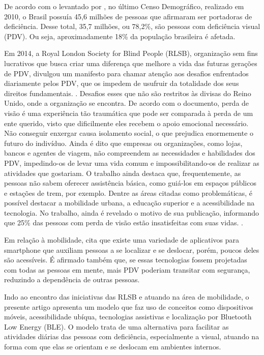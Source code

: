 \documentclass[twoside,english,brazilian]{UNISINOSartigo}
\begin{document}
De acordo com o levantado por , no último Censo Demográfico, realizado em 2010, o Brasil possuía 45,6 milhões de pessoas que afirmaram ser portadoras de deficiência. Desse total, 35,7 milhões, ou 78,2\%, são pessoas com deficiência visual (PDV). Ou seja, aproximadamente 18\% da população brasileira é afetada.

Em 2014, a Royal London Society for Blind People (RLSB), organização sem fins lucrativos que busca criar uma diferença que melhore a vida das futuras gerações de PDV, divulgou um manifesto para chamar atenção aos desafios enfrentados diariamente pelos PDV, que os impedem de usufruir da totalidade dos seus direitos fundamentais. \cite{YouthManifesto}. Desafios esses que não são restritos às divisas do Reino Unido, onde a organização se encontra.
De acordo com o documento, perda de visão é uma experiência tão traumática que pode ser comparada à perda de um ente querido, visto que dificilmente eles recebem o apoio emocional necessário. Não conseguir enxergar causa isolamento social, o que prejudica enormemente o futuro do indivíduo. Ainda é dito que empresas ou organizações, como lojas, bancos e agentes de viagem, não compreendem as necessidades e habilidades dos PDV, impedindo-os de levar uma vida comum e impossibilitando-os de realizar as atividades que gostariam. O trabalho ainda destaca que, frequentemente, as pessoas não sabem oferecer assistência básica, como guiá-los em espaços públicos e estações de trem, por exemplo. Dentre as áreas citadas como problemáticas, é possível destacar a mobilidade urbana, a educação superior e a acessibilidade na tecnologia. No trabalho, ainda é revelado o motivo de sua publicação, informando que 25\% das pessoas com perda de visão estão insatisfeitas com suas vidas. \cite{YouthManifesto}.

Em relação à mobilidade,  cita que existe uma variedade de aplicativos para smartphone que auxiliam pessoas a se localizar e se deslocar, porém, poucos deles são acessíveis. É afirmado também que, se essas tecnologias fossem projetadas com todas as pessoas em mente, mais PDV poderiam transitar com segurança, reduzindo a dependência de outras pessoas.

Indo ao encontro das iniciativas das RLSB e atuando na área de mobilidade, o presente artigo apresenta um modelo que faz uso de conceitos como dispositivos móveis, acessibilidade ubíqua, tecnologias assistivas e localização por Bluetooth Low Energy (BLE). O modelo trata de uma alternativa para facilitar as atividades diárias das pessoas com deficiência, especialmente a visual, atuando na forma com que elas se orientam e se deslocam em ambientes internos.
\end{document}
